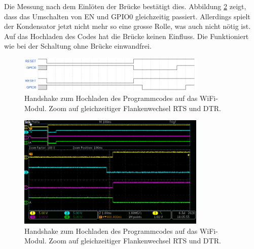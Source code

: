 Die Messung nach dem Einlöten der Brücke bestätigt dies. Abbildung \ref{fig:ESP32_RTS_DTR_EN_IO0_mit_Bruecke_1} zeigt, dass das Umschalten von EN und GPIO0 gleichzeitig passiert. Allerdings spielt der Kondensator jetzt nicht mehr so eine grosse Rolle, was auch nicht nötig ist. Auf das Hochladen des Codes hat die Brücke keinen Einfluss. Die Funktioniert wie bei der Schaltung ohne Brücke einwandfrei.


\begin{figure}[H]
\center
\includegraphics[width = 0.8\textwidth]{graphics/ESP32_Handshake_Forum}
\caption{Handshake zum Hochladen des Programmcodes auf das WiFi-Modul. Zoom auf gleichzeitiger Flankenwechsel RTS und DTR. \cite{liudr_trying_2017}}
\label{fig:ESP32_Handshake_Forum}
\end{figure}

\begin{figure}[H]
\center
\includegraphics[width = 0.8\textwidth]{graphics/ESP32_RTS_DTR_EN_IO0_mit_Bruecke_1}
\caption{Handshake zum Hochladen des Programmcodes auf das WiFi-Modul. Zoom auf gleichzeitiger Flankenwechsel RTS und DTR.}
\label{fig:ESP32_RTS_DTR_EN_IO0_mit_Bruecke_1}
\end{figure}
